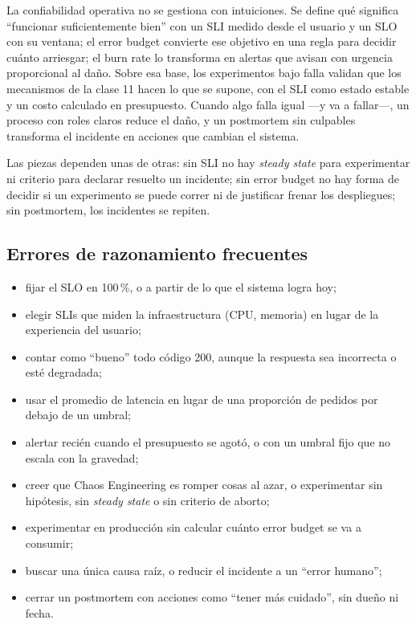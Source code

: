 \documentclass[variant=apuntes,cover=institutional,mode=screen]{ua-engineering-v6-article}
\begin{document}
La confiabilidad operativa no se gestiona con intuiciones. Se define qué significa ``funcionar suficientemente bien'' con un SLI medido desde el usuario y un SLO con su ventana; el error budget convierte ese objetivo en una regla para decidir cuánto arriesgar; el burn rate lo transforma en alertas que avisan con urgencia proporcional al daño. Sobre esa base, los experimentos bajo falla validan que los mecanismos de la clase 11 hacen lo que se supone, con el SLI como estado estable y un costo calculado en presupuesto. Cuando algo falla igual ---y va a fallar---, un proceso con roles claros reduce el daño, y un postmortem sin culpables transforma el incidente en acciones que cambian el sistema.

Las piezas dependen unas de otras: sin SLI no hay \emph{steady state} para experimentar ni criterio para declarar resuelto un incidente; sin error budget no hay forma de decidir si un experimento se puede correr ni de justificar frenar los despliegues; sin postmortem, los incidentes se repiten.

\subsection*{Errores de razonamiento frecuentes}
\begin{itemize}
\item fijar el SLO en 100\,\%, o a partir de lo que el sistema logra hoy;
\item elegir SLIs que miden la infraestructura (CPU, memoria) en lugar de la experiencia del usuario;
\item contar como ``bueno'' todo código 200, aunque la respuesta sea incorrecta o esté degradada;
\item usar el promedio de latencia en lugar de una proporción de pedidos por debajo de un umbral;
\item alertar recién cuando el presupuesto se agotó, o con un umbral fijo que no escala con la gravedad;
\item creer que Chaos Engineering es romper cosas al azar, o experimentar sin hipótesis, sin \emph{steady state} o sin criterio de aborto;
\item experimentar en producción sin calcular cuánto error budget se va a consumir;
\item buscar una única causa raíz, o reducir el incidente a un ``error humano'';
\item cerrar un postmortem con acciones como ``tener más cuidado'', sin dueño ni fecha.
\end{itemize}
\end{document}
